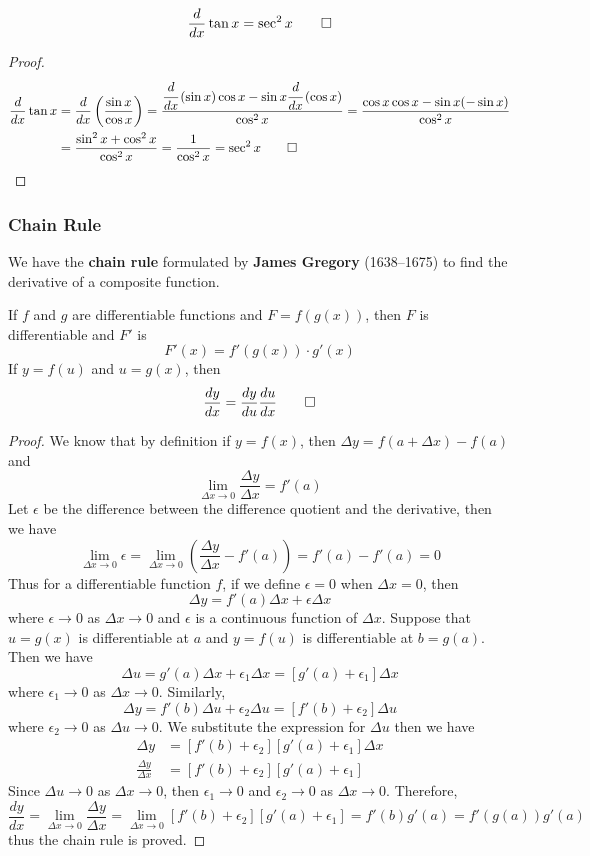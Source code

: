 \begin{theorem}
    \[\frac{d}{dx}\tan x=\sec^2 x \qedhere\]
\end{theorem}
\begin{proof}
    \begin{align*}
        \frac{d}{dx}\tan x&= \frac{d}{dx}\left(\frac{\sin x}{\cos x}\right)
        =\frac{\cfrac{d}{dx}\left(\sin x\right)\cos x
        -\sin x\cfrac{d}{dx}\left(\cos x\right)}{\cos^2 x}
        =\frac{\cos x\cos x-\sin x(-\sin x)}{\cos^2 x}  \\
        &= \frac{\sin^2 x+\cos^2 x}{\cos^2 x}=\frac{1}{\cos^2 x}
        =\sec^2 x \qedhere
    \end{align*}
\end{proof}

\subsubsection{Chain Rule}
We have the \textbf{chain rule} formulated by \textbf{James Gregory}
(1638--1675) to find the derivative of a composite function.
\begin{theorem}
    If \(f\) and \(g\) are differentiable functions and \(F=f(g(x))\),
    then \(F\) is differentiable and \(F'\) is
    \[F'(x)=f'(g(x))\cdot g'(x)\]
    If \(y=f(u)\) and \(u=g(x)\), then
    \[\frac{dy}{dx}=\frac{dy}{du}\frac{du}{dx} \qedhere\]
\end{theorem}
\begin{proof}
    We know that by definition if \(y=f(x)\),
    then \(\Delta y=f(a+\Delta x)-f(a)\) and
    \[\lim_{\Delta x\to 0}\frac{\Delta y}{\Delta x}=f'(a)\]
    Let \(\epsilon\) be the difference between the difference quotient and the
    derivative, then we have
    \[\lim_{\Delta x\to 0}\epsilon
    =\lim_{\Delta x\to 0}\left(\frac{\Delta y}{\Delta x}-f'(a)\right)
    =f'(a)-f'(a)=0\]
    Thus for a differentiable function \(f\), if we define \(\epsilon=0\)
    when \(\Delta x=0\), then \[\Delta y=f'(a)\Delta x+\epsilon\Delta x\]
    where \(\epsilon\to 0\) as \(\Delta x\to 0\) and \(\epsilon\) is a
    continuous function of \(\Delta x\).
    Suppose that \(u=g(x)\) is differentiable at \(a\) and \(y=f(u)\) is
    differentiable at \(b=g(a)\).
    Then we have
    \[\Delta u=g'(a)\Delta x+\epsilon_1\Delta x=[g'(a)+\epsilon_1]\Delta x\]
    where \(\epsilon_1\to 0\) as \(\Delta x\to 0\).
    Similarly, \[\Delta y=f'(b)\Delta u+\epsilon_2\Delta u=[f'(b)+\epsilon_2]\Delta u\]
    where \(\epsilon_2\to 0\) as \(\Delta u\to 0\).
    We substitute the expression for \(\Delta u\) then we have
    \begin{align*}
        \Delta y &= [f'(b)+\epsilon_2][g'(a)+\epsilon_1]\Delta x \\
        \frac{\Delta y}{\Delta x} &= [f'(b)+\epsilon_2][g'(a)+\epsilon_1]
    \end{align*}
    Since \(\Delta u\to 0\) as \(\Delta x\to 0\), then \(\epsilon_1\to 0\) and
    \(\epsilon_2 \to 0\) as \(\Delta x\to 0\).
    Therefore,
    \[\frac{dy}{dx}=\lim_{\Delta x\to 0}\frac{\Delta y}{\Delta x}
    =\lim_{\Delta x\to 0}[f'(b)+\epsilon_2][g'(a)+\epsilon_1]
    =f'(b)g'(a)=f'(g(a))g'(a)\]
    thus the chain rule is proved.
\end{proof}